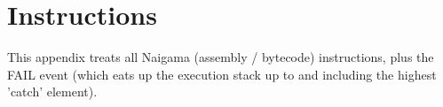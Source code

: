 \section{Instructions}
\label{app:instr}

This appendix treats all Naigama (assembly / bytecode) instructions,
plus the FAIL event (which eats up the execution stack up to and
including the highest 'catch' element).
